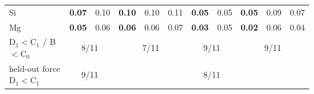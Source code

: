 \begin{table}[t]
\begin{ruledtabular}
\begin{tabular}{lcccccccccc}
Si & \textbf{0.07} & 0.10 & \textbf{0.10} & 0.10 & 0.11 & \textbf{0.05} & 0.05 & \textbf{0.05} & 0.09 & 0.07\\
Mg & \textbf{0.05} & 0.06 & \textbf{0.06} & 0.06 & 0.07 & \textbf{0.03} & 0.05 & \textbf{0.02} & 0.06 & 0.04\\
\hline
D$_1<$C$_1$ / B$<$C$_0$ & \multicolumn{2}{c}{8/11} & \multicolumn{3}{c}{7/11} & \multicolumn{2}{c}{9/11} & \multicolumn{3}{c}{9/11}\\
held-out force D$_1<$C$_1$ & \multicolumn{2}{c}{9/11} & \multicolumn{3}{c}{} & \multicolumn{2}{c}{8/11} & \multicolumn{3}{c}{}\\
\end{tabular}
\end{ruledtabular}
\end{table}
